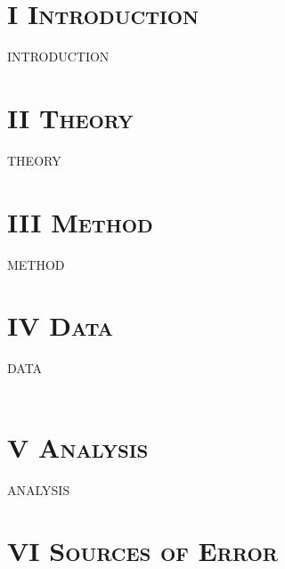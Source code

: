 \documentclass[12pt,notitlepage,twoside]{article}
\begin{document}
        
        \fontsize{3.8mm}{1em}\selectfont
        \begin{multicols*}{2}
                \section*{\centering\normalsize{\textsc{I Introduction}}}
                \fontsize{3.8mm}{1em}\selectfont
                \qquad
               
                INTRODUCTION \\
               
                \section*{\centering\normalsize{\textsc{II Theory}}}
                \fontsize{3.8mm}{1em}\selectfont
                \qquad
                
                THEORY\\                                      
                                                     
                \section*{\centering\normalsize{\textsc{III Method}}}
                \fontsize{3.8mm}{1em}\selectfont
                \qquad
                METHOD
               
                \section*{\centering\normalsize{\textsc{IV Data}}}
                \fontsize{3.8mm}{1em}\selectfont
                \qquad 
                DATA\\\\
                                                             
                \section*{\centering\normalsize{\textsc{V Analysis}}}
                \fontsize{3.8mm}{1em}\selectfont
	            \qquad
	            ANALYSIS
               
                \section*{\centering\normalsize{\textsc{VI Sources of Error}}}
                \fontsize{3.8mm}{1em}\selectfont
                \qquad 
                

\end{multicols*}
\end{document}
